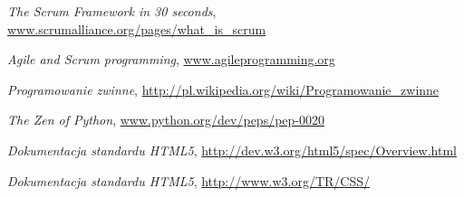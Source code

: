 \begin{thebibliography}{99}

   \emph{The Scrum Framework in 30 seconds}, \url{www.scrumalliance.org/pages/what_is_scrum}

   \emph{Agile and Scrum programming}, \url{www.agileprogramming.org}

   \emph{Programowanie zwinne}, \url{http://pl.wikipedia.org/wiki/Programowanie_zwinne}

   \emph{The Zen of Python}, \url{www.python.org/dev/peps/pep-0020}

   \emph{Dokumentacja standardu HTML5}, \url{http://dev.w3.org/html5/spec/Overview.html}

   \emph{Dokumentacja standardu HTML5}, \url{http://www.w3.org/TR/CSS/}

\end{thebibliography}

